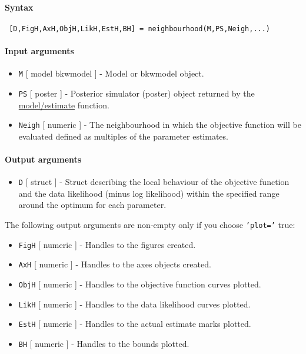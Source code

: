 


	\paragraph{Syntax}
 
 \begin{verbatim}
 [D,FigH,AxH,ObjH,LikH,EstH,BH] = neighbourhood(M,PS,Neigh,...)
 \end{verbatim}
 
 \paragraph{Input arguments}
 
 \begin{itemize}
 \item
   \texttt{M} {[} model \textbar{} bkwmodel {]} - Model or bkwmodel
   object.
 \item
   \texttt{PS} {[} poster {]} - Posterior simulator (poster) object
   returned by the \url{model/estimate} function.
 \item
   \texttt{Neigh} {[} numeric {]} - The neighbourhood in which the
   objective function will be evaluated defined as multiples of the
   parameter estimates.
 \end{itemize}
 
 \paragraph{Output arguments}
 
 \begin{itemize}
 \item
   \texttt{D} {[} struct {]} - Struct describing the local behaviour of
   the objective function and the data likelihood (minus log likelihood)
   within the specified range around the optimum for each parameter.
 \end{itemize}
 
 The following output arguments are non-empty only if you choose
 \texttt{'plot='} true:
 
 \begin{itemize}
 \item
   \texttt{FigH} {[} numeric {]} - Handles to the figures created.
 \item
   \texttt{AxH} {[} numeric {]} - Handles to the axes objects created.
 \item
   \texttt{ObjH} {[} numeric {]} - Handles to the objective function
   curves plotted.
 \item
   \texttt{LikH} {[} numeric {]} - Handles to the data likelihood curves
   plotted.
 \item
   \texttt{EstH} {[} numeric {]} - Handles to the actual estimate marks
   plotted.
 \item
   \texttt{BH} {[} numeric {]} - Handles to the bounds plotted.
 \end{itemize}
 
